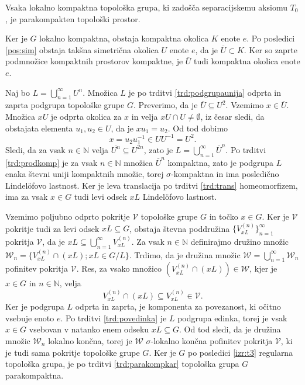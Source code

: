 \documentclass[mat1]{fmfdelo}
\newcommand{\N}{\mathbb N}
\newcommand{\closure}[1]{\overline{#1}}
\begin{document}
\begin{izrek}\label{izr:t4}
	Vsaka lokalno kompaktna topološka grupa, ki zadošča separacijskemu aksiomu $T_0$, je parakompakten topološki prostor.
\end{izrek}

\begin{dokaz}
Ker je $G$ lokalno kompaktna, obstaja kompaktna okolica $K$ enote $e$. Po posledici \ref{pos:sim} obstaja takšna simetrična okolica $U$ enote $e$, da je $\closure{U} \subset K$. Ker so zaprte podmnožice kompaktnih prostorov kompaktne, je $\closure{U}$ tudi kompaktna okolica enote $e$.

Naj bo $L = \bigcup_{n=1}^\infty U^n$. Množica $L$ je po trditvi \ref{trd:podgrupaunija} odprta in zaprta podgrupa topološke grupe $G$.
Preverimo, da je $\closure{U} \subseteq U^2$. Vzemimo $x \in \closure{U}$. Množica $xU$ je odprta okolica za $x$ in velja $xU \cap U \neq \emptyset$, iz česar sledi, da obstajata elementa $u_1,u_2 \in U$, da je $xu_1 = u_2$. Od tod dobimo
\[ x = u_2u_1^{-1} \in UU^{-1} = U^2. \]
Sledi, da za vsak $n \in \N$ velja $\closure{U^n} \subseteq U^{2n}$, zato je $L = \bigcup_{n=1}^\infty \closure{U}^n$. Po trditvi \ref{trd:prodkomp} je za vsak $n \in \N$ množica $\closure{U}^n$ kompaktna, zato je podgrupa $L$ enaka števni uniji kompaktnih množic, torej $\sigma$-kompaktna in ima posledično Lindel\"ofovo lastnost. Ker je leva translacija po trditvi \ref{trd:trans} homeomorfizem, ima za vsak $x \in G$ tudi levi odsek $xL$ Lindel\"ofovo lastnost.

Vzemimo poljubno odprto pokritje $\mathcal{V}$ topološke grupe $G$ in točko $x \in G$.
Ker je $\mathcal{V}$ pokritje tudi za levi odsek $xL \subseteq G$, obstaja števna poddružina $\lbrace V_{xL}^{(n)} \rbrace_{n = 1}^{\infty}$ pokritja $\mathcal{V}$, da je $xL \subseteq \bigcup_{n=1}^{\infty}V_{xL}^{(n)}$. Za vsak $n \in \N$ definirajmo družino množic $\mathcal{W}_n = \lbrace V_{xL}^{(n)} \cap (xL) ; xL \in G/L \rbrace$.
Trdimo, da je družina množic $\mathcal{W} = \bigcup_{n=1}^{\infty}\mathcal{W}_n$ pofinitev pokritja $\mathcal{V}$. Res, za vsako množico $(V_{xL}^{(n)} \cap (xL)) \in \mathcal{W}$, kjer je $x \in G$ in $n \in \N$, velja
\[ V_{xL}^{(n)} \cap (xL) \subseteq V_{xL}^{(n)} \in \mathcal{V}. \]
Ker je podgrupa $L$ odprta in zaprta, je komponenta za povezanost, ki očitno vsebuje enoto $e$. Po trditvi \ref{trd:povedinka} je $L$ podgrupa edinka, torej je vsak $x \in G$ vsebovan v natanko enem odseku $xL \subseteq G$. Od tod sledi, da je družina množic $\mathcal{W}_n$ lokalno končna, torej je $\mathcal{W}$ $\sigma$-lokalno končna pofinitev pokritja $\mathcal{V}$, ki je tudi sama pokritje topološke grupe $G$. Ker je $G$ po posledici \ref{izr:t3} regularna topološka grupa, je po trditvi \ref{trd:parakompkar} topološka grupa $G$ parakompaktna.
\end{dokaz}
\end{document}
